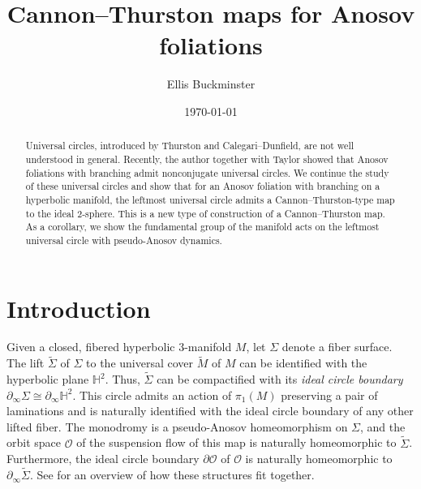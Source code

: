 \documentclass[11pt]{amsart}
\newcommand{\HH}[0]{\mathbb{H}}
\newcommand{\wt}{\widetilde}
\newcommand{\orb}{\mathcal{O}}
\numberwithin{equation}{section}
\theoremstyle{definition}
\begin{document}
\title{Cannon--Thurston maps for Anosov foliations}

\author{Ellis Buckminster}
\address{Department of Mathematics\\
	University of Pennsylvania}

\date{\today}

\begin{abstract}


	Universal circles, introduced by Thurston and Calegari--Dunfield, are not well understood in general. Recently, the author together with Taylor showed that Anosov foliations with branching admit nonconjugate universal circles. We continue the study of these universal circles and show that for an Anosov foliation with branching on a hyperbolic manifold, the leftmost universal circle admits a Cannon--Thurston-type map to the ideal 2-sphere. This is a new type of construction of a Cannon--Thurston map. 
	As a corollary, we show the fundamental group of the manifold acts on the leftmost universal circle with pseudo-Anosov dynamics.
	

	
	
\end{abstract}
\maketitle


\setcounter{tocdepth}{1}
\tableofcontents

\section{Introduction}\label{sec:intro}

Given a closed, fibered hyperbolic 3-manifold $M$, let $\Sigma$ denote a fiber surface. The lift $\wt\Sigma$ of $\Sigma$ to the universal cover $\wt M$ of $M$ can be identified with the hyperbolic plane $\HH^2$. Thus, $\wt\Sigma$ can be compactified with its \emph{ideal circle boundary} $\partial_\infty\Sigma\cong\partial_\infty\HH^2$. This circle admits an action of $\pi_1(M)$ preserving a pair of laminations and is naturally identified with the ideal circle boundary of any other lifted fiber. The monodromy is a pseudo-Anosov homeomorphism on $\Sigma$, and the orbit space $\orb$ of the suspension flow of this map is naturally homeomorphic to $\wt\Sigma$. Furthermore, the ideal circle boundary $\partial\orb$ of $\orb$ is naturally homeomorphic to $\partial_\infty\wt\Sigma$. See  for an overview of how these structures fit together.
\end{document}
